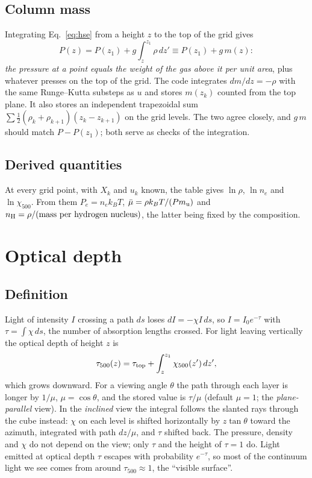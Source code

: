 \subsection{Column mass}\label{sec:mass}
Integrating Eq.~\eqref{eq:hse} from a height $z$ to the top of the grid gives
\begin{equation}
P(z)=P(z_1)+g\int_z^{z_1}\rho\,dz'\equiv P(z_1)+g\,m(z):\label{eq:colmass}
\end{equation}
\emph{the pressure at a point equals the weight of the gas above it per unit area}, plus whatever presses on the top of the
grid. The code integrates $dm/dz=-\rho$ with the same Runge--Kutta substeps as $u$ and stores $m(z_k)$ counted from the top
plane. It also stores an independent trapezoidal sum $\sum\tfrac12(\rho_k+\rho_{k+1})(z_k-z_{k+1})$ on the grid levels. The
two agree closely, and $g\,m$ should match $P-P(z_1)$; both serve as checks of the integration.

\subsection{Derived quantities}
At every grid point, with $X_k$ and $u_k$ known, the table gives $\ln\rho$, $\ln n_e$ and $\ln\chi_{500}$. From them
$P_e=n_ek_BT$, $\bar\mu=\rho k_BT/(P m_{\rm u})$ and $n_{\rm H}=\rho/(\text{mass per hydrogen nucleus})$, the latter being
fixed by the composition.

\section{Optical depth}\label{sec:tau}
\subsection{Definition}
Light of intensity $I$ crossing a path $ds$ loses $dI=-\chi I\,ds$, so $I=I_0e^{-\tau}$ with $\tau=\int\chi\,ds$, the number
of absorption lengths crossed. For light leaving vertically the optical depth of height $z$ is
\begin{equation}
\tau_{500}(z)=\tau_{\rm top}+\int_z^{z_1}\chi_{500}(z')\,dz' ,\label{eq:tau}
\end{equation}
which grows downward. For a viewing angle $\theta$ the path through each layer is longer by $1/\mu$, $\mu=\cos\theta$, and
the stored value is $\tau/\mu$ (default $\mu=1$; the \emph{plane-parallel} view). In the \emph{inclined} view the integral
follows the slanted rays through the cube instead: $\chi$ on each level is shifted horizontally by $z\tan\theta$ toward the azimuth,
integrated with path $dz/\mu$, and $\tau$ shifted back. The pressure, density and $\chi$ do not depend on the view; only $\tau$
and the height of $\tau=1$ do. Light emitted at optical depth $\tau$ escapes with probability $e^{-\tau}$, so
most of the continuum light we see comes from around $\tau_{500}\approx1$, the ``visible surface''.

